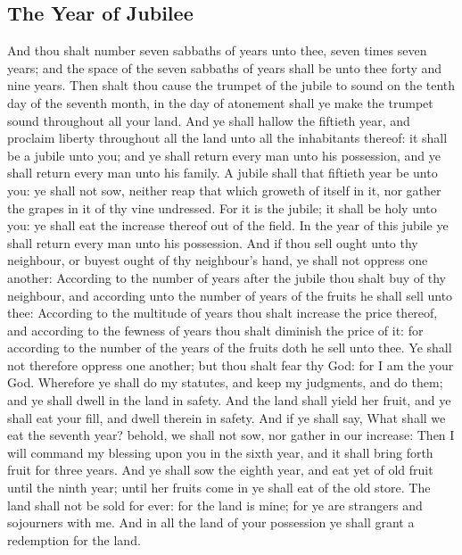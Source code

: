 \begin{biblechapter}
\section*{The Year of Jubilee}
\verse And thou shalt number seven sabbaths of years unto thee, seven times seven years; and the space of the seven sabbaths of years shall be unto thee forty and nine years.
\verse Then shalt thou cause the trumpet of the jubile to sound on the tenth day of the seventh month, in the day of atonement shall ye make the trumpet sound throughout all your land.
\verse And ye shall hallow the fiftieth year, and proclaim liberty throughout all the land unto all the inhabitants thereof: it shall be a jubile unto you; and ye shall return every man unto his possession, and ye shall return every man unto his family.
\verse A jubile shall that fiftieth year be unto you: ye shall not sow, neither reap that which groweth of itself in it, nor gather the grapes in it of thy vine undressed.
\verse For it is the jubile; it shall be holy unto you: ye shall eat the increase thereof out of the field.
\verse In the year of this jubile ye shall return every man unto his possession.
\verse And if thou sell ought unto thy neighbour, or buyest ought of thy neighbour's hand, ye shall not oppress one another:
\verse According to the number of years after the jubile thou shalt buy of thy neighbour, and according unto the number of years of the fruits he shall sell unto thee:
\verse According to the multitude of years thou shalt increase the price thereof, and according to the fewness of years thou shalt diminish the price of it: for according to the number of the years of the fruits doth he sell unto thee.
\verse Ye shall not therefore oppress one another; but thou shalt fear thy God: for I am the \LORD your God.
\verse Wherefore ye shall do my statutes, and keep my judgments, and do them; and ye shall dwell in the land in safety.
\verse And the land shall yield her fruit, and ye shall eat your fill, and dwell therein in safety.
\verse And if ye shall say, What shall we eat the seventh year? behold, we shall not sow, nor gather in our increase:
\verse Then I will command my blessing upon you in the sixth year, and it shall bring forth fruit for three years.
\verse And ye shall sow the eighth year, and eat yet of old fruit until the ninth year; until her fruits come in ye shall eat of the old store.
\verse The land shall not be sold for ever: for the land is mine; for ye are strangers and sojourners with me.
\verse And in all the land of your possession ye shall grant a redemption for the land.

\end{biblechapter}
